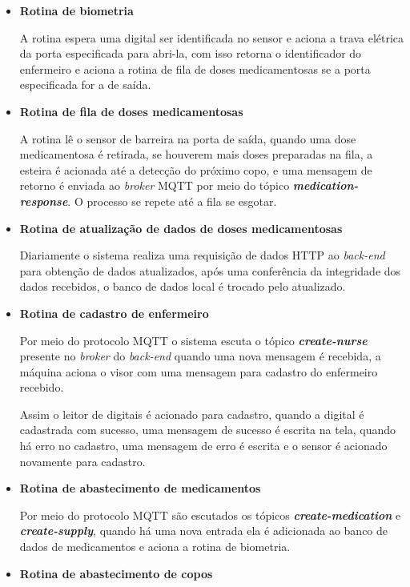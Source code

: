 \begin{itemize}
    \item \textbf{Rotina de biometria}
    
    A rotina espera uma digital ser identificada no sensor e aciona a trava elétrica da porta especificada para abri-la, com isso retorna o identificador do enfermeiro e aciona a rotina de fila de doses medicamentosas se a porta especificada for a de saída.
    
    \item \textbf{Rotina de fila de doses medicamentosas}
    
    A rotina lê o sensor de barreira na porta de saída, quando uma dose medicamentosa é retirada, se houverem mais doses preparadas na fila, a esteira é acionada 
    até a detecção do próximo copo, e uma mensagem de retorno é enviada ao \textit{broker} MQTT por meio do tópico \textit{\textbf{medication-response}}. O processo se repete até a fila se esgotar.
    
    \item \textbf{Rotina de atualização de dados de doses medicamentosas} 
    
    Diariamente o sistema realiza uma requisição de dados HTTP ao \textit{back-end} para obtenção de dados atualizados, após uma conferência da integridade dos dados recebidos, o banco de dados local é trocado pelo atualizado.
    
    \item \textbf{Rotina de cadastro de enfermeiro}
    
    Por meio do protocolo MQTT o sistema escuta o tópico \textbf{\textit{create-nurse}} presente no \textit{broker} do \textit{back-end} quando uma nova mensagem é recebida, a máquina aciona o visor com uma mensagem para cadastro do enfermeiro recebido.
    
    Assim o leitor de digitais é acionado para cadastro, quando a digital é cadastrada com sucesso, uma mensagem de sucesso é escrita na tela, quando há erro no cadastro, uma mensagem de erro é escrita e o sensor é acionado novamente para cadastro.
    
    \item \textbf{Rotina de abastecimento de medicamentos}
    
    Por meio do protocolo MQTT são escutados os tópicos \textit{\textbf{create-medication}} e \textit{\textbf{create-supply}}, quando há uma nova entrada ela é adicionada ao banco de dados de medicamentos e aciona a rotina de biometria.
    
    \item \textbf{Rotina de abastecimento de copos}
    

\end{itemize}
